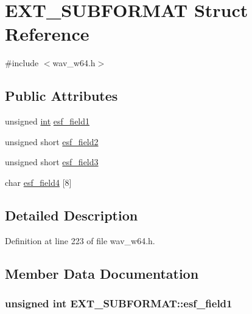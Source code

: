 \hypertarget{struct_e_x_t___s_u_b_f_o_r_m_a_t}{}\section{E\+X\+T\+\_\+\+S\+U\+B\+F\+O\+R\+M\+AT Struct Reference}
\label{struct_e_x_t___s_u_b_f_o_r_m_a_t}


{\ttfamily \#include $<$wav\+\_\+w64.\+h$>$}

\subsection*{Public Attributes}
\begin{DoxyCompactItemize}
\item 
unsigned \hyperlink{xmltok_8h_a5a0d4a5641ce434f1d23533f2b2e6653}{int} \hyperlink{struct_e_x_t___s_u_b_f_o_r_m_a_t_a14167b1366f477bee4d95371ae55a3f0}{esf\+\_\+field1}
\item 
unsigned short \hyperlink{struct_e_x_t___s_u_b_f_o_r_m_a_t_add78406adf8904bf86c058b1c425d2b6}{esf\+\_\+field2}
\item 
unsigned short \hyperlink{struct_e_x_t___s_u_b_f_o_r_m_a_t_a3147359e88f43a8ba3cae5427f29271a}{esf\+\_\+field3}
\item 
char \hyperlink{struct_e_x_t___s_u_b_f_o_r_m_a_t_aab7f636902cc16236b8dedabbbb8778d}{esf\+\_\+field4} \mbox{[}8\mbox{]}
\end{DoxyCompactItemize}


\subsection{Detailed Description}


Definition at line 223 of file wav\+\_\+w64.\+h.



\subsection{Member Data Documentation}
\subsubsection[{\texorpdfstring{esf\+\_\+field1}{esf_field1}}]{\setlength{\rightskip}{0pt plus 5cm}unsigned {\bf int} E\+X\+T\+\_\+\+S\+U\+B\+F\+O\+R\+M\+A\+T\+::esf\+\_\+field1}\hypertarget{struct_e_x_t___s_u_b_f_o_r_m_a_t_a14167b1366f477bee4d95371ae55a3f0}{}\label{struct_e_x_t___s_u_b_f_o_r_m_a_t_a14167b1366f477bee4d95371ae55a3f0}


